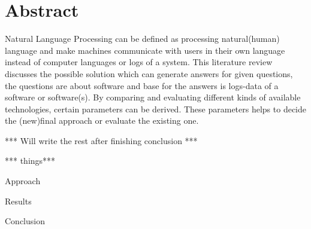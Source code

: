 

\chapter*{Abstract}
\label{cha:abstract}



 Natural Language Processing can be defined as processing natural(human) language and make machines communicate with users in their own language instead of computer languages or logs of a system. This literature review discusses the possible solution which can generate answers for given questions, the questions are about software and base for the answers is logs-data of a software or software(s). By comparing and evaluating different kinds of available technologies, certain parameters can be derived. These parameters helps to decide the (new)final approach or evaluate the existing one. 

	*** Will write the rest after finishing conclusion ***
	
*** things***
	
Approach 

Results 

Conclusion 



